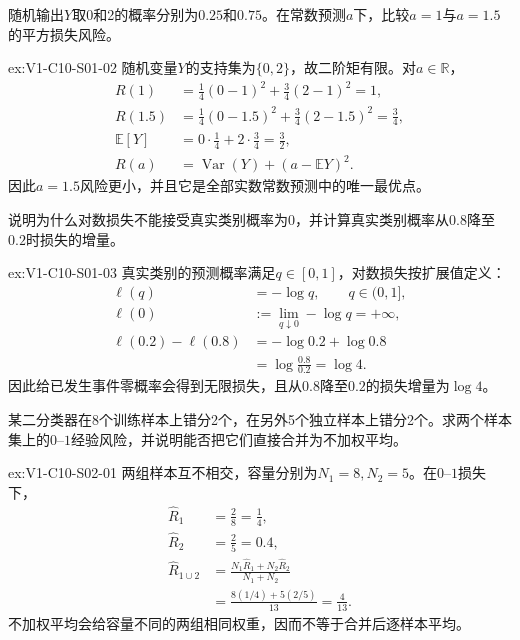 \begin{SLChapterExercisePairSection}
\begin{exercise}\label{ex:V1-C10-S01-02}
随机输出$Y$取0和2的概率分别为$0.25$和$0.75$。在常数预测$a$下，比较$a=1$与$a=1.5$的平方损失风险。
\end{exercise}
\label{sol:V1-C10-S01-02}
\begin{chapterexercisesolution}{ex:V1-C10-S01-02}
随机变量$Y$的支持集为$\{0,2\}$，故二阶矩有限。对$a\in\mathbb R$，
\[
\begin{aligned}
R(1)
  &=\tfrac14(0-1)^2+\tfrac34(2-1)^2=1,\\
R(1.5)
  &=\tfrac14(0-1.5)^2+\tfrac34(2-1.5)^2
    =\tfrac34,\\
\mathbb E[Y]&=0\cdot\tfrac14+2\cdot\tfrac34=\tfrac32,\\
R(a)&=\operatorname{Var}(Y)+(a-\mathbb E Y)^2.
\end{aligned}
\]
因此$a=1.5$风险更小，并且它是全部实数常数预测中的唯一最优点。
\end{chapterexercisesolution}

\begin{exercise}\label{ex:V1-C10-S01-03}
说明为什么对数损失不能接受真实类别概率为0，并计算真实类别概率从$0.8$降至$0.2$时损失的增量。
\end{exercise}
\label{sol:V1-C10-S01-03}
\begin{chapterexercisesolution}{ex:V1-C10-S01-03}
真实类别的预测概率满足$q\in[0,1]$，对数损失按扩展值定义：
\[
\begin{aligned}
\ell(q)&=-\log q,\qquad q\in(0,1],\\
\ell(0)&:=\lim_{q\downarrow0}-\log q=+\infty,\\
\ell(0.2)-\ell(0.8)
  &=-\log0.2+\log0.8\\
  &=\log\frac{0.8}{0.2}=\log4.
\end{aligned}
\]
因此给已发生事件零概率会得到无限损失，且从$0.8$降至$0.2$的损失增量为$\log4$。
\end{chapterexercisesolution}

\begin{exercise}\label{ex:V1-C10-S02-01}
某二分类器在8个训练样本上错分2个，在另外5个独立样本上错分2个。求两个样本集上的$0$--$1$经验风险，并说明能否把它们直接合并为不加权平均。
\end{exercise}
\label{sol:V1-C10-S02-01}
\begin{chapterexercisesolution}{ex:V1-C10-S02-01}
两组样本互不相交，容量分别为$N_1=8,N_2=5$。在$0$--$1$损失下，
\[
\begin{aligned}
\widehat R_1&=\frac{2}{8}=\frac14,\\
\widehat R_2&=\frac{2}{5}=0.4,\\
\widehat R_{1\cup2}
  &=\frac{N_1\widehat R_1+N_2\widehat R_2}{N_1+N_2}\\
  &=\frac{8(1/4)+5(2/5)}{13}
    =\frac4{13}.
\end{aligned}
\]
不加权平均会给容量不同的两组相同权重，因而不等于合并后逐样本平均。
\end{chapterexercisesolution}


\end{SLChapterExercisePairSection}
